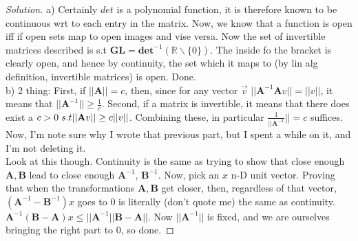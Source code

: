 \documentclass{article}
\newcommand{\R}{\mathbb{R}}
\newcommand{\ma}[1]{\mathbf{#1}}
\newcommand{\A}{\mathbf{A}}
\newcommand{\B}{\mathbf{B}}
\newenvironment{problem}[2][Problem]{\begin{trivlist}
\item[\hskip \labelsep {\bfseries #1}\hskip \labelsep {\bfseries #2.}]}{\end{trivlist}}
\newenvironment{solution}{\begin{proof}[Solution]}{\end{proof}}
\begin{document}
\begin{problem}{1}
\end{problem}

\begin{solution}
    a) Certainly $det$ is a polynomial function, it is therefore known to be continuous wrt to each entry in the matrix. Now, we know that a function is open iff if open sets map to open images and vise versa. Now the set of invertible matrices described is s.t $\mathbf{GL} = \mathbf{det}^{-1}(\R \backslash \{0\})$. The inside fo the bracket is clearly open, and hence by continuity, the set which it maps to (by lin alg definition, invertible matrices) is open. Done.
    \\
    b) 2 thing: First, if $||\ma{A}|| = c $, then, since for any vector $\vec{v}$ $||\ma{A}^{-1}\ma{A}v|| = ||v||$, it means that $||\ma{A}^{-1}|| \geq \frac{1}{c}$. Second, if a matrix is invertible, it means that there does exist a $c>0 \spa s.t ||\ma{A}v|| \geq c||v||$. Combining these, in particular $\frac{1}{||\ma{A}^{-1}}|| = c$ suffices. Now, I'm note sure why I wrote that previous part, but I spent a while on it, and I'm not deleting it. 
\\
Look at this though. Continuity is the same as trying to show that close enough $\A , \B$ lead to close enough $\A ^{-1} $, $\B ^{-1}$. Now, pick an $x$ n-D unit vector. Proving that when the transformations $\A , \B$ get closer, then, regardless of that vector, $(\A^{-1}-\B^{-1})x$ goes to $0$ is literally (don't quote me) the same as continuity. $\A^{-1}(\B-\A)x \leq ||\A^{-1}||\B-\A||$. Now $||\A^{-1}||$ is fixed, and we are ourselves bringing the right part to 0, so done.
\end{solution}
\end{document}
